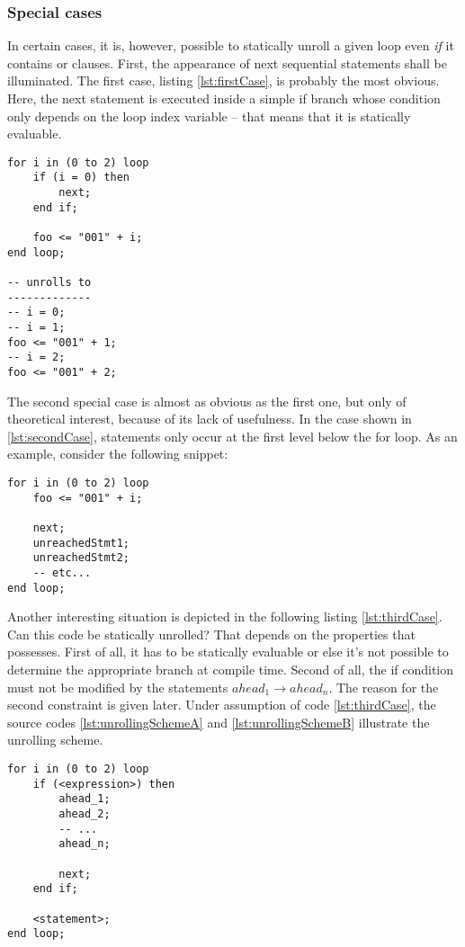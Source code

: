 \subsubsection{Special cases}

In certain cases, it is, however, possible to statically unroll a
given  loop
even \emph{if} it contains  or  clauses. First, the
appearance of next sequential statements shall be illuminated.
The first case, listing \ref{lst:firstCase}, is
probably the most obvious. Here, the next statement is executed inside
a simple if branch whose condition only depends on the loop index
variable -- that means that it is statically evaluable.
%
\begin{lstlisting}[style=vhdl,caption={First special
      case},label={lst:firstCase}]
for i in (0 to 2) loop
    if (i = 0) then
        next;
    end if;

    foo <= "001" + i;
end loop;

-- unrolls to
-------------
-- i = 0;
-- i = 1;
foo <= "001" + 1;
-- i = 2;
foo <= "001" + 2;
\end{lstlisting}
%
The second special case is almost as obvious as the first one, but
only of theoretical interest, because of its lack of usefulness. In
the case shown in \ref{lst:secondCase},  statements only occur at the first
level
below the for loop. As an example, consider the following snippet:
%
\begin{lstlisting}[style=vhdl,caption={Second special
      case},label={lst:secondCase}]
for i in (0 to 2) loop
    foo <= "001" + i;

    next;
    unreachedStmt1;
    unreachedStmt2;
    -- etc...
end loop;
\end{lstlisting}
%
Another interesting situation is depicted in the following listing
\ref{lst:thirdCase}.
Can this code be statically unrolled? That depends
on the properties that  possesses. First of all, it
has to be statically evaluable or else it's not possible to determine
the appropriate branch at compile time. Second of all, the if
condition must not
be modified by the statements \(ahead_1 \to ahead_n\). The reason
for the second constraint is given later. Under assumption of code
\ref{lst:thirdCase}, the source codes
\ref{lst:unrollingSchemeA} and \ref{lst:unrollingSchemeB} illustrate
the unrolling scheme.
%
\begin{lstlisting}[style=vhdl,caption={Third special case},label={lst:thirdCase}]
for i in (0 to 2) loop
    if (<expression>) then
        ahead_1;
        ahead_2;
        -- ...
        ahead_n;

        next;
    end if;

    <statement>;
end loop;
\end{lstlisting}



